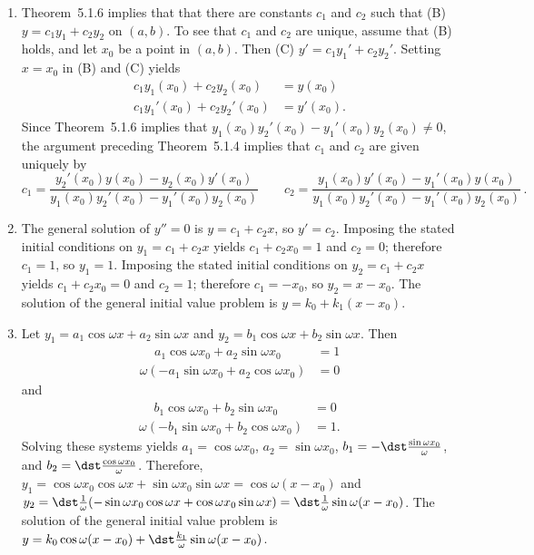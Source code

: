 \documentclass[openany]{book}
\newenvironment{sectionSolutions}{
 \begin{enumerate}[item-label={\thesection.\arabic{enumi}.}]
}{
 \end{enumerate}
}
\begin{document}
\begin{sectionSolutions}
\item Theorem~5.1.6 implies that
that there are constants $c_1$ and $c_2$ such that
(B) $y=c_1y_1+c_2y_2$
on $(a,b)$. To see that $c_1$ and $c_2$ are unique, assume that (B)
holds, and let $x_0$ be a point in  $(a,b)$. Then (C)
$y'=c_1y_1'+c_2y_2'$. Setting $x=x_0$ in (B) and (C) yields
\begin{align*}
c_1y_1(x_0)+c_2y_2(x_0)&=y(x_0)\\
c_1y_1'(x_0)+c_2y_2'(x_0)&=y'(x_0).
\end{align*}
Since  Theorem~5.1.6  implies that
$y_1(x_0)y_2'(x_0)-y_1'(x_0)y_2(x_0)\ne0$, the argument preceding
 Theorem~5.1.4 implies that $c_1$ and $c_2$ are given
uniquely by
\[
c_1=\frac{y_2'(x_0)y(x_0)-y_2(x_0)y'(x_0)}{
y_1(x_0)y_2'(x_0)-y_1'(x_0)y_2(x_0)}\qquad
c_2=\frac{y_1(x_0)y'(x_0)-y_1'(x_0)y(x_0)}{
y_1(x_0)y_2'(x_0)-y_1'(x_0)y_2(x_0)}\,.
\]


\item
The general solution of $y''=0$ is $y=c_1+c_2x$, so $y'=c_2$. Imposing
the stated initial conditions on $y_1=c_1+c_2x$  yields $c_1+c_2x_0=1$
and $c_2=0$; therefore $c_1=1$, so $y_1=1$.
Imposing the stated initial conditions on $y_2=c_1+c_2x$  yields
$c_1+c_2x_0=0$ and $c_2=1$; therefore $c_1=-x_0$, so $y_2=x-x_0$.
The solution of the general initial value problem is
$y=k_0+k_1(x-x_0)$.


\item
Let $y_1=a_1\cos\omega x+a_2\sin\omega x$ and
 $y_2=b_1\cos\omega x+b_2\sin\omega x$. Then
\begin{align*}
\phantom{(-}a_1\cos\omega x_0+a_2\sin\omega x_0\phantom{)}&=1\\
\omega(-a_1\sin\omega x_0+a_2\cos\omega x_0)&=0
\end{align*}
and
\begin{align*}
\phantom{(-}b_1\cos\omega x_0+b_2\sin\omega x_0\phantom{)}&=0\\
\omega(-b_1\sin\omega x_0+b_2\cos\omega x_0)&=1.
\end{align*}
Solving these systems yields $a_1=\cos\omega x_0$,
$a_2=\sin\omega x_0$, $b_1=-\dst\frac{\sin\omega x_0}{\omega}$, and
$b_2=\dst\frac{\cos\omega x_0}{\omega}$. Therefore,
$y_1=\cos\omega x_0\cos\omega x+\sin\omega x_0\sin\omega
x=\cos\omega(x-x_0)$ and
 $y_2=\dst\frac{1}{\omega}(-\sin\omega x_0\cos\omega x+\cos\omega x_0
\sin\omega x)=\dst\frac{1}{\omega}\sin\omega(x-x_0)$.
 The solution of the general
initial value problem is
$y=k_0\cos\omega(x-x_0)+\dst\frac{k_1}{\omega}\sin\omega(x-x_0)$.



\end{sectionSolutions}
\end{document}
